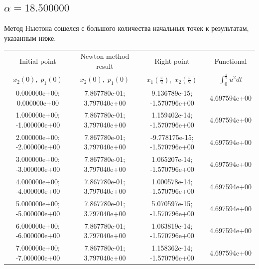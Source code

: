 \documentclass[titlepage]{article}
\def\l{\left}
\def\r{\right}
\begin{document}
\subsection{$\alpha = 18.500000$} 
Метод Ньютона сошелся с большого количества начальных точек к результатам, указанным ниже. \\ 
\begin{tabular}{ | c | c | c | c |} 
\hline 
Initial point  & Newton method result & Right point & Functional 
 \\ $x_2(0), \; p_1(0)$ & $x_2(0), \; p_1(0)$ & $x_1\l(\frac{\pi}{2}\r), \; x_2\l(\frac{\pi}{2}\r)$ & $\int_{0}^{\frac{\pi}{2}}u^2dt$  \\ \hline 
0.000000e+00; 0.000000e+00 & 7.867780e-01; 3.797040e+00 & 9.136789e-15; -1.570796e+00 & 4.697594e+00 \\ \hline 
1.000000e+00; -1.000000e+00 & 7.867780e-01; 3.797040e+00 & 1.159402e-14; -1.570796e+00 & 4.697594e+00 \\ \hline 
2.000000e+00; -2.000000e+00 & 7.867780e-01; 3.797040e+00 & -9.778175e-15; -1.570796e+00 & 4.697594e+00 \\ \hline 
3.000000e+00; -3.000000e+00 & 7.867780e-01; 3.797040e+00 & 1.065207e-14; -1.570796e+00 & 4.697594e+00 \\ \hline 
4.000000e+00; -4.000000e+00 & 7.867780e-01; 3.797040e+00 & 1.000578e-14; -1.570796e+00 & 4.697594e+00 \\ \hline 
5.000000e+00; -5.000000e+00 & 7.867780e-01; 3.797040e+00 & 5.070597e-15; -1.570796e+00 & 4.697594e+00 \\ \hline 
6.000000e+00; -6.000000e+00 & 7.867780e-01; 3.797040e+00 & 1.063819e-14; -1.570796e+00 & 4.697594e+00 \\ \hline 
7.000000e+00; -7.000000e+00 & 7.867780e-01; 3.797040e+00 & 1.158362e-14; -1.570796e+00 & 4.697594e+00 \\ \hline 
\end{tabular} 
\end{document}
